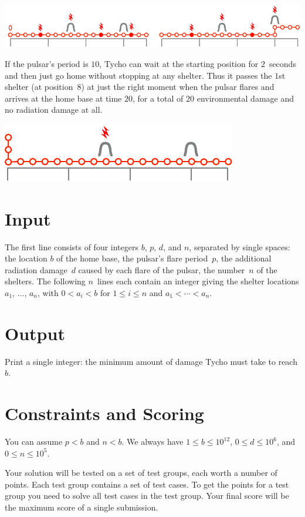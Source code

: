 \includegraphics[width=.8\textwidth]{img/sample1_2.pdf}

If the pulsar's period is $10$, Tycho can wait at the starting position for $2$~seconds and then just go home without stopping at any shelter.
Thus it passes the $1$st shelter (at position~$8$) at just the right moment when the pulsar flares and arrives at the home base at time $20$, for a total of $20$ environmental damage and no radiation damage at all.

\includegraphics[width=.4\textwidth]{img/sample3.pdf}

\section*{Input}

The first line consists of four integers $b$, $p$, $d$, and $n$, separated by single spaces:
the location $b$ of the home base,
the pulsar's flare period~$p$,
the additional radiation damage~$d$ caused by each flare of the pulsar,
the number~$n$ of the shelters.
The following $n$~lines each contain an integer giving the shelter locations $a_1$, $\ldots$, $a_n$, with 
$0<a_i< b$ for $1\leq i \leq n$ %
and 
$a_1<\cdots <a_n$. %

\section*{Output}

Print a single integer: the minimum amount of damage Tycho must take to reach $b$.

\section*{Constraints and Scoring}

You can assume
$p < b$ %
and
$n < b$. %
We always have
$1\leq b\leq 10^{12}$, %
$0\leq d \leq 10^6$, %
and
$0\leq n \leq 10^5$. %

Your solution will be tested on a set of test groups, each worth a number of points.
Each test group contains a set of test cases.
To get the points for a test group you need to solve all test cases in the test group.
Your final score will be the maximum score of a single submission.

